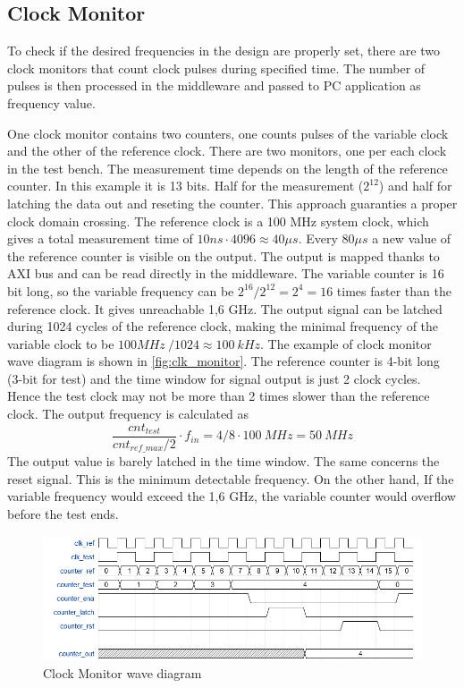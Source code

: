 \subsection{Clock Monitor}
To check if the desired frequencies in the design are properly set, there are two clock monitors that count clock pulses during specified time. The number of pulses is then processed in the middleware and passed to PC application as frequency value. 

One clock monitor contains two counters, one counts pulses of the variable clock and the other of the reference clock. There are two monitors, one per each clock in the test bench. The measurement time depends on the length of the reference counter. In this example it is 13 bits. Half for the measurement ($2^{12}$) and half for latching the data out and reseting the counter. This approach guaranties a proper clock domain crossing. The reference clock is a 100 MHz system clock, which gives a total measurement time of $10ns \cdot 4096 \approx 40 \mu s$. Every $80 \mu s$ a new value of the reference counter is visible on the output. The output is mapped thanks to AXI bus and can be read directly in the middleware. The variable counter is 16 bit long, so the variable frequency can be $2^{16}/2^{12} = 2^4 = 16$ times faster than the reference clock. It gives unreachable 1,6 GHz. The output signal can be latched during 1024 cycles of the reference clock, making the minimal frequency of the variable clock to be $100MHz\ / 1024 \approx 100 \ kHz$. The example of clock monitor wave diagram is shown in \autoref{fig:clk_monitor}. The reference counter is 4-bit long (3-bit for test) and the time window for signal output is just 2 clock cycles. Hence the test clock may not be more than 2 times slower than the reference clock. The output frequency is calculated as 
\begin{equation}
    \frac{cnt_{test}}{cnt_{ref\_max}/2}\cdot f_{in} = 4/8 \cdot 100 \ MHz = 50\ MHz
\end{equation}
The output value is barely latched in the time window. The same concerns the reset signal. This is the minimum detectable frequency. On the other hand, If the variable frequency would exceed the 1,6 GHz, the variable counter would overflow before the test ends.

\begin{figure}[h]
\centering
\includegraphics[width=\textwidth]{figures/clk_monitor.png}
\caption{Clock Monitor wave diagram}
\label{fig:clk_monitor}
\end{figure}

